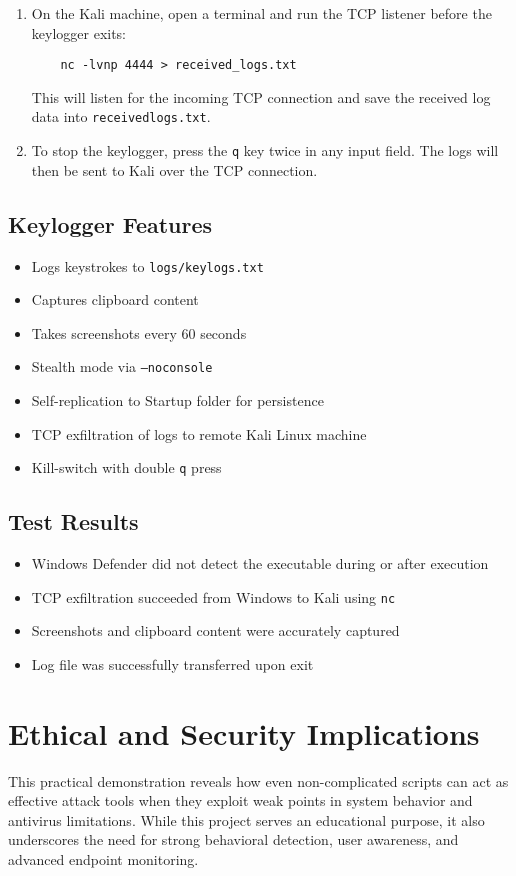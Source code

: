 \begin{enumerate}
    \item On the Kali machine, open a terminal and run the TCP listener before the keylogger exits:
    \begin{verbatim}
    nc -lvnp 4444 > received_logs.txt
    \end{verbatim}
    This will listen for the incoming TCP connection and save the received log data into \texttt{receivedlogs.txt}.

    \item To stop the keylogger, press the \texttt{q} key twice in any input field. The logs will then be sent to Kali over the TCP connection.
\end{enumerate}

\subsection{Keylogger Features}
\begin{itemize}
    \item Logs keystrokes to \texttt{logs/keylogs.txt}
    \item Captures clipboard content
    \item Takes screenshots every 60 seconds
    \item Stealth mode via \texttt{--noconsole}
    \item Self-replication to Startup folder for persistence
    \item TCP exfiltration of logs to remote Kali Linux machine
    \item Kill-switch with double \texttt{q} press
\end{itemize}

\subsection{Test Results}
\begin{itemize}
    \item Windows Defender did not detect the executable during or after execution
    \item TCP exfiltration succeeded from Windows to Kali using \texttt{nc}
    \item Screenshots and clipboard content were accurately captured
    \item Log file was successfully transferred upon exit
\end{itemize}

\section{Ethical and Security Implications}
This practical demonstration reveals how even non-complicated scripts can act as effective attack tools when they exploit weak points in system behavior and antivirus limitations. While this project serves an educational purpose, it also underscores the need for strong behavioral detection, user awareness, and advanced endpoint monitoring.

